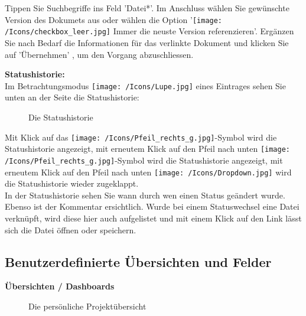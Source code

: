 Tippen Sie Suchbegriffe ins Feld 'Datei*'. Im Anschluss wählen Sie gewünschte Version des Dokumets aus oder wählen die Option '\texttt{[image: /Icons/checkbox\_leer.jpg]} Immer die neuste Version referenzieren'. Ergänzen Sie nach Bedarf die Informationen für das verlinkte Dokument und klicken Sie auf 'Übernehmen' , um den Vorgang abzuschliessen.

\vspace{\baselineskip}

\textbf{Statushistorie:}\\
Im Betrachtungsmodus \texttt{[image: /Icons/Lupe.jpg]} eines Eintrages sehen Sie unten an der Seite die Statushistorie:

\begin{figure}[H]
\caption{Die Statushistorie}
\end{figure}

Mit Klick auf das \texttt{[image: /Icons/Pfeil\_rechts\_g.jpg]}-Symbol wird die Statushistorie  angezeigt, mit erneutem Klick auf den Pfeil nach unten \texttt{[image: /Icons/Pfeil\_rechts\_g.jpg]}-Symbol wird die Statushistorie angezeigt, mit erneutem Klick auf den Pfeil nach unten \texttt{[image: /Icons/Dropdown.jpg]} wird die Statushistorie wieder zugeklappt.\\
In der Statushistorie sehen Sie wann durch wen einen Status geändert wurde. Ebenso ist der Kommentar ersichtlich. Wurde bei einem Statuswechsel eine Datei verknüpft, wird diese hier auch aufgelistet  und mit einem Klick auf den Link lässt sich die Datei öffnen oder speichern.

\subsection{Benutzerdefinierte Übersichten und Felder}

\textbf{Übersichten / Dashboards}

\vspace{\baselineskip}

\begin{figure}[H]
\caption{Die persönliche Projektübersicht}
\end{figure}

